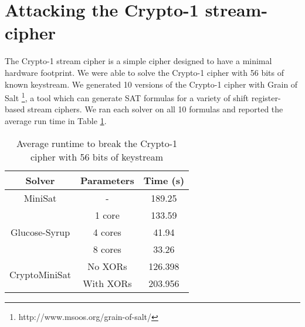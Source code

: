 \section{Attacking the Crypto-1 stream-cipher}
The Crypto-1 stream cipher is a simple cipher designed to have a minimal hardware footprint. We were able to solve the Crypto-1 cipher with 56 bits of known keystream. We generated 10 versions of the Crypto-1 cipher with Grain of Salt \footnote{http://www.msoos.org/grain-of-salt/}, a tool which can generate SAT formulas for a variety of shift register-based stream ciphers. We ran each solver on all 10 formulas and reported the average run time in Table \ref{table:crypto1:runtime}.

\begin{table}[!htbp]
	\centering
	\begin{tabular}{|c|c|c|}
		\hline
		\textbf{Solver} & \textbf{Parameters} & \textbf{Time (s)} \\
		\hline
		MiniSat & - & 189.25 \\
		\hline
		\multirow{3}{*}{Glucose-Syrup} & 1 core & 133.59 \\ \cline{2-3}
		& 4 cores & 41.94 \\ \cline{2-3}
		& 8 cores & 33.26 \\
		\hline
		
		\multirow{2}{*}{CryptoMiniSat} & No {XORs} & 126.398 \\ \cline{2-3}
		& With {XORs} & 203.956 \\ \cline{2-3}
		\hline
	\end{tabular}
	
	\label{table:crypto1:runtime}
	\caption{Average runtime to break the Crypto-1 cipher with 56 bits of keystream}
\end{table}